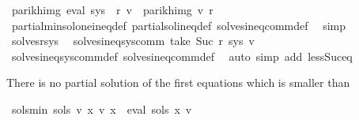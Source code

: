 \begin{isabellebody}
\ {\isachardoublequoteopen}parikh{\isacharunderscore}{\kern0pt}img\ {\isacharparenleft}{\kern0pt}eval\ {\isacharparenleft}{\kern0pt}sys\ {\isacharbang}{\kern0pt}\ r{\isacharparenright}{\kern0pt}\ v{\isacharparenright}{\kern0pt}\ {\isasymsubseteq}\ parikh{\isacharunderscore}{\kern0pt}img\ {\isacharparenleft}{\kern0pt}v\ r{\isacharparenright}{\kern0pt}{\isachardoublequoteclose}\isanewline
\ \ \ \ \isamarkupfalse%
\ partial{\isacharunderscore}{\kern0pt}min{\isacharunderscore}{\kern0pt}sol{\isacharunderscore}{\kern0pt}one{\isacharunderscore}{\kern0pt}ineq{\isacharunderscore}{\kern0pt}def\ partial{\isacharunderscore}{\kern0pt}sol{\isacharunderscore}{\kern0pt}ineq{\isacharunderscore}{\kern0pt}def\ solves{\isacharunderscore}{\kern0pt}ineq{\isacharunderscore}{\kern0pt}comm{\isacharunderscore}{\kern0pt}def\ \isamarkupfalse%
\ simp\isanewline
\ \ \isamarkupfalse%
\ solves{\isacharunderscore}{\kern0pt}r{\isacharunderscore}{\kern0pt}sys\ \isamarkupfalse%
\ {\isachardoublequoteopen}solves{\isacharunderscore}{\kern0pt}ineq{\isacharunderscore}{\kern0pt}sys{\isacharunderscore}{\kern0pt}comm\ {\isacharparenleft}{\kern0pt}take\ {\isacharparenleft}{\kern0pt}Suc\ r{\isacharparenright}{\kern0pt}\ sys{\isacharparenright}{\kern0pt}\ v{\isachardoublequoteclose}\isanewline
\ \ \ \ \isamarkupfalse%
\ solves{\isacharunderscore}{\kern0pt}ineq{\isacharunderscore}{\kern0pt}sys{\isacharunderscore}{\kern0pt}comm{\isacharunderscore}{\kern0pt}def\ solves{\isacharunderscore}{\kern0pt}ineq{\isacharunderscore}{\kern0pt}comm{\isacharunderscore}{\kern0pt}def\ \isamarkupfalse%
\ {\isacharparenleft}{\kern0pt}auto\ simp\ add{\isacharcolon}{\kern0pt}\ less{\isacharunderscore}{\kern0pt}Suc{\isacharunderscore}{\kern0pt}eq{\isacharparenright}{\kern0pt}\isanewline
{}\isamarkupfalse%
%
\endisatagproof
{\isafoldproof}%
%
\isadelimproof
%
\endisadelimproof
%
\begin{isamarkuptext}%
There is no partial solution of the first  equations which is smaller than %
\end{isamarkuptext}\isamarkuptrue%
\isamarkupfalse%
\ sols{\isacharprime}{\kern0pt}{\isacharunderscore}{\kern0pt}min{\isacharcolon}{\kern0pt}\ {\isachardoublequoteopen}{\isasymforall}sols{}\ v{}{\isachardot}{\kern0pt}\ {\isacharparenleft}{\kern0pt}{\isasymforall}x{\isachardot}{\kern0pt}\ v{}\ x\ {\isacharequal}{\kern0pt}\ eval\ {\isacharparenleft}{\kern0pt}sols{}\ x{\isacharparenright}{\kern0pt}\ v{}{\isacharparenright}{\kern0pt}\isanewline

\end{isabellebody}
